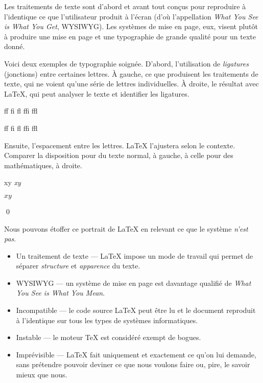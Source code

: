 \begin{exemple}
  Les traitements de texte sont d'abord et avant tout conçus pour
  reproduire à l'identique ce que l'utilisateur produit à l'écran
  (d'où l'appellation \emph{What You See is What You Get}, WYSIWYG).
  Les systèmes de mise en page, eux, visent plutôt à produire une mise
  en page et une typographie de grande qualité pour un texte donné.

  Voici deux exemples de typographie soignée. D'abord, l'utilisation
  de \emph{ligatures} (jonctions) entre certaines lettres. À gauche,
  ce que produisent les traitements de texte, qui ne voient qu'une
  série de lettres individuelles. À droite, le résultat avec {\LaTeX},
  qui peut analyser le texte et identifier les ligatures.
  \begin{demo}
    \centering
    \begin{minipage}{0.3\linewidth}
      \rmfamily f\/f \quad f\/i \quad f\/l \quad f\/f\/i \quad
      f\/f\/l
    \end{minipage}
    \qquad
    \begin{minipage}{0.3\linewidth}
      \rmfamily ff \quad fi \quad fl \quad ffi \quad ffl
    \end{minipage}
  \end{demo}

  Ensuite, l'espacement entre les lettres. {\LaTeX} l'ajustera selon
  le contexte. Comparer la disposition pour du texte normal, à gauche,
  à celle pour des mathématiques, à droite.
  \begin{demo}
    \centering
    \begin{minipage}{0.3\linewidth}
      \rmfamily xy \quad \emph{xy}
    \end{minipage}
    \qquad
    \begin{minipage}{0.3\linewidth}
      $xy$
    \end{minipage}
  \end{demo}
  \qed
\end{exemple}

Nous pouvons étoffer ce portrait de {\LaTeX} en relevant ce que le
système \emph{n'est pas}.

\begin{itemize}
\item Un traitement de texte --- {\LaTeX} impose un mode de travail
  qui permet de séparer \emph{structure} et \emph{apparence} du texte.
\item WYSIWYG --- un système de mise en page est davantage qualifié de
  \emph{What You See is What You Mean}.
\item Incompatible --- le code source {\LaTeX} peut être lu et le
  document reproduit à l'identique sur tous les types de systèmes
  informatiques.
\item Instable --- le moteur {\TeX} est considéré exempt de bogues.
\item Imprévisible --- {\LaTeX} fait uniquement et exactement ce qu'on
  lui demande, sans prétendre pouvoir deviner ce que nous voulons
  faire ou, pire, le savoir mieux que nous.
\end{itemize}


